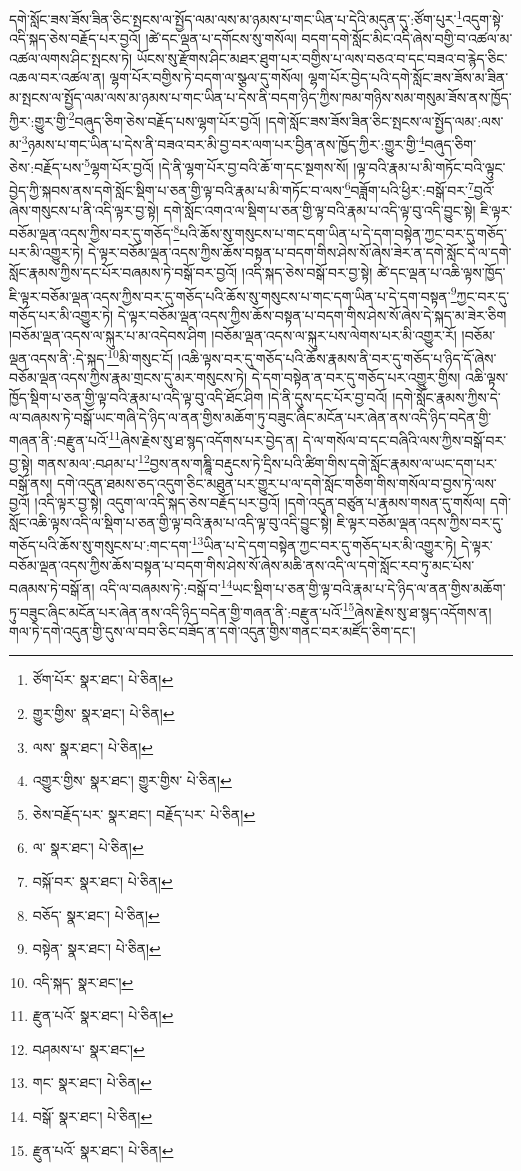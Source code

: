 དགེ་སློང་ཟས་ཟོས་ཟིན་ཅིང་སྤངས་ལ་སྤྱོད་ལམ་ལས་མ་ཉམས་པ་གང་ཡིན་པ་དེའི་མདུན་དུ་:ཙོག་པུར་\footnote{ཙོག་པོར་  སྣར་ཐང་།  པེ་ཅིན། }འདུག་སྟེ་འདི་སྐད་ཅེས་བརྗོད་པར་བྱའོ། །ཚེ་དང་ལྡན་པ་དགོངས་སུ་གསོལ། བདག་དགེ་སློང་མིང་འདི་ཞེས་བགྱི་བ་འཚལ་མ་འཚལ་ལགས་ཤིང་སྤངས་ཏེ། ཡོངས་སུ་རྫོགས་ཤིང་མཐར་ཐུག་པར་བགྱིས་པ་ལས་བཅའ་བ་དང་བཟའ་བ་རྙེད་ཅིང་འཆལ་བར་འཚལ་ན། ལྷག་པོར་བགྱིས་ཏེ་བདག་ལ་སྩལ་དུ་གསོལ། ལྷག་པོར་བྱེད་པའི་དགེ་སློང་ཟས་ཟོས་མ་ཟིན་མ་སྤངས་ལ་སྤྱོད་ལམ་ལས་མ་ཉམས་པ་གང་ཡིན་པ་དེས་ནི་བདག་ཉིད་ཀྱིས་ཁམ་གཉིས་སམ་གསུམ་ཟོས་ནས་ཁྱོད་ཀྱིར་:གྱུར་གྱི་\footnote{གྱུར་གྱིས་  སྣར་ཐང་།  པེ་ཅིན། }བཞུད་ཅིག་ཅེས་བརྗོད་པས་ལྷག་པོར་བྱའོ། །དགེ་སློང་ཟས་ཟོས་ཟིན་ཅིང་སྤངས་ལ་སྤྱོད་ལམ་:ལས་མ་\footnote{ལས་  སྣར་ཐང་།  པེ་ཅིན། }ཉམས་པ་གང་ཡིན་པ་དེས་ནི་བཟའ་བར་མི་བྱ་བར་ལག་པར་བྱིན་ནས་ཁྱོད་ཀྱིར་:གྱུར་གྱི་\footnote{འགྱུར་གྱིས་  སྣར་ཐང་། གྱུར་གྱིས་  པེ་ཅིན། }བཞུད་ཅིག་ཅེས་:བརྗོད་པས་\footnote{ཅེས་བརྗོད་པར་  སྣར་ཐང་། བརྗོད་པར་  པེ་ཅིན། }ལྷག་པོར་བྱའོ། །དེ་ནི་ལྷག་པོར་བྱ་བའི་ཆོ་ག་དང་སྔགས་སོ། །ལྟ་བའི་རྣམ་པ་མི་གཏོང་བའི་ལྟུང་བྱེད་ཀྱི་སྐབས་ནས་དགེ་སློང་སྡིག་པ་ཅན་གྱི་ལྟ་བའི་རྣམ་པ་མི་གཏོང་བ་ལས་\footnote{ལ་  སྣར་ཐང་།  པེ་ཅིན། }བཟློག་པའི་ཕྱིར་:བསྒོ་བར་\footnote{བསྐོ་བར་  སྣར་ཐང་།  པེ་ཅིན། }བྱའོ་ཞེས་གསུངས་པ་ནི་འདི་ལྟར་བྱ་སྟེ། དགེ་སློང་འགའ་ལ་སྡིག་པ་ཅན་གྱི་ལྟ་བའི་རྣམ་པ་འདི་ལྟ་བུ་འདི་བྱུང་སྟེ། ཇི་ལྟར་བཅོམ་ལྡན་འདས་ཀྱིས་བར་དུ་གཅོད་\footnote{བཅོད་  སྣར་ཐང་།  པེ་ཅིན། }པའི་ཆོས་སུ་གསུངས་པ་གང་དག་ཡིན་པ་དེ་དག་བསྟེན་ཀྱང་བར་དུ་གཅོད་པར་མི་འགྱུར་ཏེ། དེ་ལྟར་བཅོམ་ལྡན་འདས་ཀྱིས་ཆོས་བསྟན་པ་བདག་གིས་ཤེས་སོ་ཞེས་ཟེར་ན་དགེ་སློང་དེ་ལ་དགེ་སློང་རྣམས་ཀྱིས་དང་པོར་བཞམས་ཏེ་བསྒོ་བར་བྱའོ། །འདི་སྐད་ཅེས་བསྒོ་བར་བྱ་སྟེ། ཚེ་དང་ལྡན་པ་འཆི་ལྟས་ཁྱོད་ཇི་ལྟར་བཅོམ་ལྡན་འདས་ཀྱིས་བར་དུ་གཅོད་པའི་ཆོས་སུ་གསུངས་པ་གང་དག་ཡིན་པ་དེ་དག་བསྟན་\footnote{བསྟེན་  སྣར་ཐང་།  པེ་ཅིན། }ཀྱང་བར་དུ་གཅོད་པར་མི་འགྱུར་ཏེ། དེ་ལྟར་བཅོམ་ལྡན་འདས་ཀྱིས་ཆོས་བསྟན་པ་བདག་གིས་ཤེས་སོ་ཞེས་དེ་སྐད་མ་ཟེར་ཅིག །བཅོམ་ལྡན་འདས་ལ་སྐུར་པ་མ་འདེབས་ཤིག །བཅོམ་ལྡན་འདས་ལ་སྐུར་པས་ལེགས་པར་མི་འགྱུར་རོ། །བཅོམ་ལྡན་འདས་ནི་:དེ་སྐད་\footnote{འདི་སྐད་  སྣར་ཐང་། }མི་གསུང་ངོ། །འཆི་ལྟས་བར་དུ་གཅོད་པའི་ཆོས་རྣམས་ནི་བར་དུ་གཅོད་པ་ཉིད་དོ་ཞེས་བཅོམ་ལྡན་འདས་ཀྱིས་རྣམ་གྲངས་དུ་མར་གསུངས་ཏེ། དེ་དག་བསྟེན་ན་བར་དུ་གཅོད་པར་འགྱུར་གྱིས། འཆི་ལྟས་ཁྱོད་སྡིག་པ་ཅན་གྱི་ལྟ་བའི་རྣམ་པ་འདི་ལྟ་བུ་འདི་ཐོང་ཤིག །དེ་ནི་དུས་དང་པོར་བྱ་བའོ། །དགེ་སློང་རྣམས་ཀྱིས་དེ་ལ་བཞམས་ཏེ་བསྒོ་ཡང་གཞི་དེ་ཉིད་ལ་ནན་གྱིས་མཆོག་ཏུ་བཟུང་ཞིང་མངོན་པར་ཞེན་ནས་འདི་ཉིད་བདེན་གྱི་གཞན་ནི་:བརྫུན་པའོ་\footnote{རྫུན་པའོ་  སྣར་ཐང་།  པེ་ཅིན། }ཞེས་རྗེས་སུ་ཐ་སྙད་འདོགས་པར་བྱེད་ན། དེ་ལ་གསོལ་བ་དང་བཞིའི་ལས་ཀྱིས་བསྒོ་བར་བྱ་སྟེ། གནས་མལ་:བཤམ་པ་\footnote{བཤམས་པ་  སྣར་ཐང་། }བྱས་ནས་གཎྜཱི་བརྡུངས་ཏེ་དྲིས་པའི་ཚིག་གིས་དགེ་སློང་རྣམས་ལ་ཡང་དག་པར་བསྒོ་ནས། དགེ་འདུན་ཐམས་ཅད་འདུག་ཅིང་མཐུན་པར་གྱུར་པ་ལ་དགེ་སློང་གཅིག་གིས་གསོལ་བ་བྱས་ཏེ་ལས་བྱའོ། །འདི་ལྟར་བྱ་སྟེ། འདུག་ལ་འདི་སྐད་ཅེས་བརྗོད་པར་བྱའོ། །དགེ་འདུན་བཙུན་པ་རྣམས་གསན་དུ་གསོལ། དགེ་སློང་འཆི་ལྟས་འདི་ལ་སྡིག་པ་ཅན་གྱི་ལྟ་བའི་རྣམ་པ་འདི་ལྟ་བུ་འདི་བྱུང་སྟེ། ཇི་ལྟར་བཅོམ་ལྡན་འདས་ཀྱིས་བར་དུ་གཅོད་པའི་ཆོས་སུ་གསུངས་པ་:གང་དག་\footnote{གང་  སྣར་ཐང་།  པེ་ཅིན། }ཡིན་པ་དེ་དག་བསྟེན་ཀྱང་བར་དུ་གཅོད་པར་མི་འགྱུར་ཏེ། དེ་ལྟར་བཅོམ་ལྡན་འདས་ཀྱིས་ཆོས་བསྟན་པ་བདག་གིས་ཤེས་སོ་ཞེས་མཆི་ནས་འདི་ལ་དགེ་སློང་རབ་ཏུ་མང་པོས་བཞམས་ཏེ་བསྒོ་ན། འདི་ལ་བཞམས་ཏེ་:བསྒོ་བ་\footnote{བསྒོ་  སྣར་ཐང་།  པེ་ཅིན། }ཡང་སྡིག་པ་ཅན་གྱི་ལྟ་བའི་རྣམ་པ་དེ་ཉིད་ལ་ནན་གྱིས་མཆོག་ཏུ་བཟུང་ཞིང་མངོན་པར་ཞེན་ནས་འདི་ཉིད་བདེན་གྱི་གཞན་ནི་:བརྫུན་པའོ་\footnote{རྫུན་པའོ་  སྣར་ཐང་།  པེ་ཅིན། }ཞེས་རྗེས་སུ་ཐ་སྙད་འདོགས་ན། གལ་ཏེ་དགེ་འདུན་གྱི་དུས་ལ་བབ་ཅིང་བཟོད་ན་དགེ་འདུན་གྱིས་གནང་བར་མཛོད་ཅིག་དང་། 